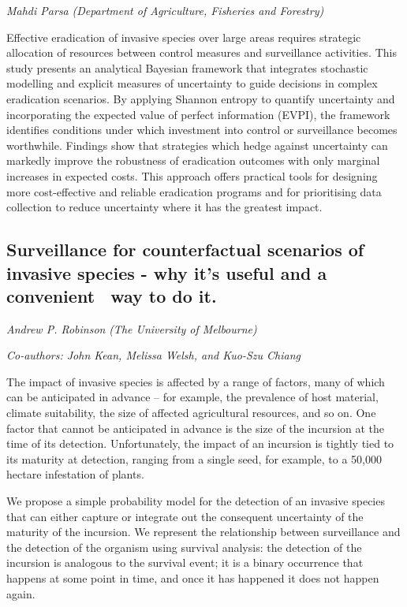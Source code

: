 \documentclass[
]{scrreprt}
\begin{document}
\emph{Mahdi Parsa} \emph{(Department of Agriculture,
Fisheries and Forestry)}

\setlength{\parskip}{0.5em}

Effective eradication of invasive species over large areas requires
strategic allocation of resources between control measures and
surveillance activities. This study presents an analytical Bayesian
framework that integrates stochastic modelling and explicit measures of
uncertainty to guide decisions in complex eradication scenarios. By
applying Shannon entropy to quantify uncertainty and incorporating the
expected value of perfect information (EVPI), the framework identifies
conditions under which investment into control or surveillance becomes
worthwhile. Findings show that strategies which hedge against
uncertainty can markedly improve the robustness of eradication outcomes
with only marginal increases in expected costs. This approach offers
practical tools for designing more cost-effective and reliable
eradication programs and for prioritising data collection to reduce
uncertainty where it has the greatest impact.

\subsection{Surveillance for counterfactual scenarios of invasive
species - why it's useful and a convenient ~way to do
it.}\label{surveillance-for-counterfactual-scenarios-of-invasive-species---why-its-useful-and-a-convenient-way-to-do-it.}

\emph{Andrew P. Robinson} \emph{(The
University of Melbourne)}

\emph{Co-authors: John Kean, Melissa Welsh, and Kuo-Szu Chiang}

\setlength{\parskip}{0.5em}

The impact of invasive species is affected by a range of factors, many
of which can be anticipated in advance -- for example, the prevalence of
host material, climate suitability, the size of affected agricultural
resources, and so on. One factor that cannot be anticipated in advance
is the size of the incursion at the time of its detection.
Unfortunately, the impact of an incursion is tightly tied to its
maturity at detection, ranging from a single seed, for example, to a
50,000 hectare infestation of plants.

We propose a simple probability model for the detection of an invasive
species that can either capture or integrate out the consequent
uncertainty of the maturity of the incursion. We represent the
relationship between surveillance and the detection of the organism
using survival analysis: the detection of the incursion is analogous to
the survival event; it is a binary occurrence that happens at some point
in time, and once it has happened it does not happen again.
\end{document}

